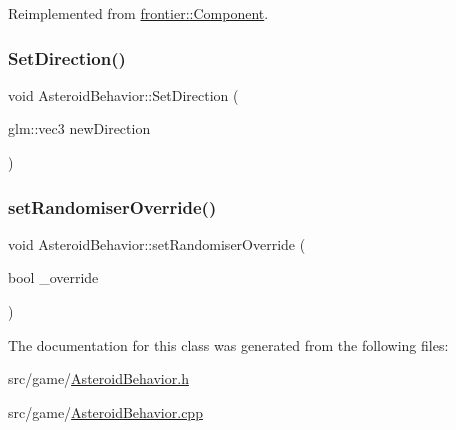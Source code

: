 Reimplemented from \hyperlink{classfrontier_1_1_component_ab920f9bc07ce051ebb5559c5a66508d1}{frontier\+::\+Component}.

\mbox{\label{class_asteroid_behavior_ab1f0bf83f6291bda3934c1b48141908f}} 
\subsubsection{\texorpdfstring{Set\+Direction()}{SetDirection()}}
{\footnotesize\ttfamily void Asteroid\+Behavior\+::\+Set\+Direction (\begin{DoxyParamCaption}\item[{glm\+::vec3}]{new\+Direction }\end{DoxyParamCaption})}

\mbox{\label{class_asteroid_behavior_a6059686f8a09c3911187407143d3a3cf}} 
\subsubsection{\texorpdfstring{set\+Randomiser\+Override()}{setRandomiserOverride()}}
{\footnotesize\ttfamily void Asteroid\+Behavior\+::set\+Randomiser\+Override (\begin{DoxyParamCaption}\item[{bool}]{\+\_\+override }\end{DoxyParamCaption})}



The documentation for this class was generated from the following files\+:\begin{DoxyCompactItemize}
\item 
src/game/\hyperlink{_asteroid_behavior_8h}{Asteroid\+Behavior.\+h}\item 
src/game/\hyperlink{_asteroid_behavior_8cpp}{Asteroid\+Behavior.\+cpp}\end{DoxyCompactItemize}
